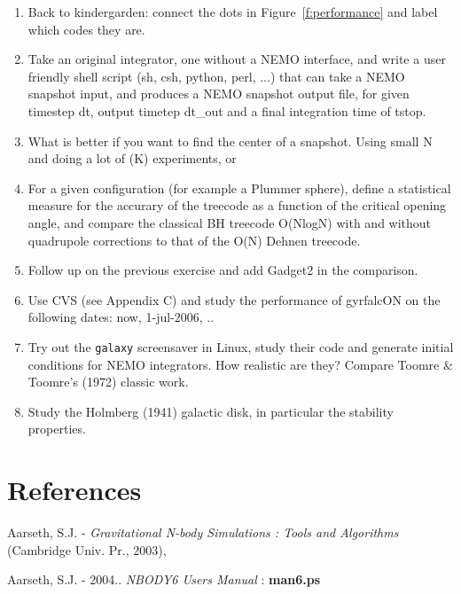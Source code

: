 {\begin{enumerate}
\item
Back to kindergarden: connect the dots in Figure~\ref{f:performance}
and label which codes they are.


\item
Take an original 
integrator, one without a NEMO interface, and write a user
friendly shell script (sh, csh, python, perl, ...) that can take a
NEMO snapshot input, and produces a NEMO snapshot output file, for
given timestep dt, output timetep dt\_out and a final integration
time of tstop.

\item
What is better if you want to find the center of a snapshot.
Using small N and doing a lot of (K) experiments, or 

\item
For a given configuration (for example a Plummer sphere), define a statistical
measure for the accurary of the treecode as a function of the critical
opening angle, and compare the classical BH treecode O(NlogN) with and
without quadrupole corrections to that of the O(N) Dehnen treecode.

\item
Follow up on the previous exercise and add Gadget2 in the comparison.

\item
Use CVS (see Appendix C) and study the performance of gyrfalcON on the following
dates:  now, 1-jul-2006, ..

\item
Try out the {\tt galaxy} screensaver in Linux, study their code
and generate initial conditions for NEMO integrators. How realistic are they?
Compare Toomre \& Toomre's (1972) classic work.

\item
Study the Holmberg (1941) galactic disk, in particular the stability properties.

\end{enumerate}


\chapter                {References}


Aarseth, S.J. - 
{\it Gravitational N-body Simulations : Tools and Algorithms} 
(Cambridge Univ. Pr., 2003),

Aarseth, S.J. - 2004.. {\it NBODY6 Users Manual} : {\bf man6.ps}

}
